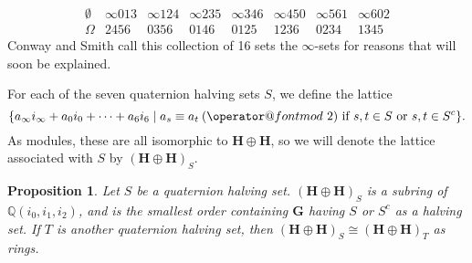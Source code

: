 \documentclass[10pt]{amsart}
\makeatletter
\newcommand{\Q}{\mathbb{Q}}
\newcommand{\HH}{\mathbf{H}}
\newcommand{\G}{\mathbf{G}}
\newtheorem{prop}[thm]{Proposition}
\DeclareRobustCommand{\pmod}{\@pmods}
\def\@pmods#1{\mkern4mu({\operator@font mod}\mkern 6mu#1)}
\makeatother
\begin{document}
$$
\begin{array}{cccccccc}
\emptyset & \infty 0 1 3 & \infty 1 2 4 & \infty 2 3 5 & \infty 3 4 6 & \infty 4 5 0 & \infty 5 6 1 & \infty 6 0 2 \\ 
\Omega & 2 4 5 6 & 0 3 5 6 & 0 1 4 6 & 0 1 2 5 & 1 2 3 6 & 0 2 3 4 & 1 3 4 5 
\end{array} 
$$
Conway and Smith call this collection of 16 sets the $\infty$-sets for reasons that will soon be explained.

For each of the seven quaternion halving sets $S$, we define the lattice
$$
\{a_\infty i_\infty + a_0i_0 + \cdots + a_6i_6 \mid
a_s \equiv a_t \pmod{2} \text{ if } s,t \in S \text{ or } s,t \in S^c\}.
$$
As modules, these are all isomorphic to $\HH \oplus \HH$, so we will denote the lattice associated with $S$ by $(\HH \oplus \HH)_S$.

\begin{prop}
\normalfont
Let $S$ be a quaternion halving set.  $(\HH \oplus \HH)_S$ is a subring of $\Q(i_0,i_1,i_2)$, and is the smallest order containing $\G$ having $S$ or $S^c$ as a halving set.  If $T$ is another quaternion halving set, then $(\HH \oplus \HH)_S \cong (\HH \oplus \HH)_T$ as rings.
\end{prop}
\end{document}
